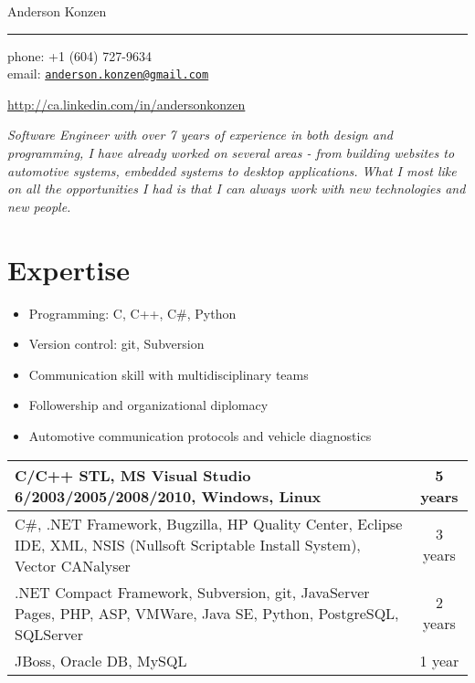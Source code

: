 \documentclass[10pt,a4paper]{article}
\makeatletter
\def\myname{Anderson Konzen}
\def\myemail{anderson.konzen@gmail.com}
\def\myskype{andersonkonzen}
\def\mycellphone{+1 (604) 727-9634}
\def\mylinkedin{http://ca.linkedin.com/in/andersonkonzen}
\def\myaddress{142 E. 42nd Avenue\\Vancouver \textsc{bc} \ V5W 1S6}
\makeatother
\begin{document}
{\LARGE \myname}\\
\hrule
\vspace{0.2in}
{\large phone: \mycellphone}\\[.05cm]
{\large email: \href{mailto:\myemail}{\texttt{\myemail}}}\\[.05cm]
{\large \href{\mylinkedin}{\mylinkedin}\\[.2cm]
\vspace{2.0in}

\textit{Software Engineer with over 7 years of experience in both design and programming, I have already worked on several areas - from building websites to automotive systems, embedded systems to desktop applications. What I most like on all the opportunities I had is that I can always work with new technologies and new people.}

\section{Expertise}
\begin{itemize}
  \item Programming: C, C++, C\#, Python
  \item Version control: git, Subversion
  \item Communication skill with multidisciplinary teams
  \item Followership and organizational diplomacy
  \item Automotive communication protocols and vehicle diagnostics
\end{itemize}
\vspace{0.1in}
\begin{center}
  \begin{tabular}{p{9cm}c}
  \toprule
  C/C++ STL, MS Visual Studio 6/2003/2005/2008/2010, Windows, Linux & 5 years \\
  \midrule
  C\#, .NET Framework, Bugzilla, HP Quality Center, Eclipse IDE, XML, NSIS (Nullsoft Scriptable Install System), Vector CANalyser & 3 years \\
  \midrule
  .NET Compact Framework, Subversion, git, JavaServer Pages, PHP, ASP, VMWare, Java SE, Python, PostgreSQL, SQLServer & 2 years \\
  \midrule
  JBoss, Oracle DB, MySQL & 1 year \\
  \bottomrule
  \end{tabular}
\end{center}

}
\end{document}
